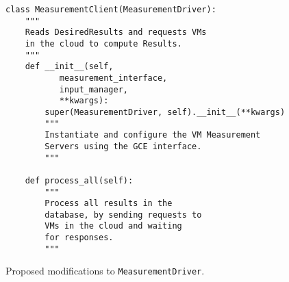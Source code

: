 \begin{listing}[htpb]
    \begin{verbatim}
class MeasurementClient(MeasurementDriver):
    """
    Reads DesiredResults and requests VMs
    in the cloud to compute Results.
    """
    def __init__(self,
           measurement_interface,
           input_manager,
           **kwargs):
        super(MeasurementDriver, self).__init__(**kwargs)
        """
        Instantiate and configure the VM Measurement 
        Servers using the GCE interface.
        """

    def process_all(self):
        """
        Process all results in the
        database, by sending requests to
        VMs in the cloud and waiting
        for responses.
        """
    \end{verbatim}
    \caption{Proposed modifications to \texttt{\footnotesize MeasurementDriver}.}
    \label{fig:measurement-client}
\end{listing}
